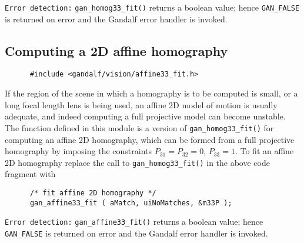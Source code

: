 {\tt Error detection:} {\tt gan\_homog33\_fit()} returns a boolean value;
hence {\tt GAN\_FALSE} is returned on error and the Gandalf error handler
is invoked.

\subsection{Computing a 2D affine homography}
\begin{verbatim}
      #include <gandalf/vision/affine33_fit.h>
\end{verbatim}
If the region of the scene in which a homography is to be computed is small,
or a long focal length lens is being used, an affine 2D model of motion is
usually adequate, and indeed computing a full projective model can become
unstable. The function defined in this module is a version of
{\tt gan\_homog33\_fit()} for computing an affine 2D homography,
which can be formed from a full projective homography by imposing the
constraints $P_{31}=P_{32}=0$, $P_{33}=1$. To fit an affine 2D homography
replace the call to {\tt gan\_homog33\_fit()} in the above code fragment with
\begin{verbatim}
      /* fit affine 2D homography */
      gan_affine33_fit ( aMatch, uiNoMatches, &m33P );
\end{verbatim}

{\tt Error detection:} {\tt gan\_affine33\_fit()} returns a boolean value;
hence {\tt GAN\_FALSE} is returned on error and the Gandalf error handler
is invoked.

